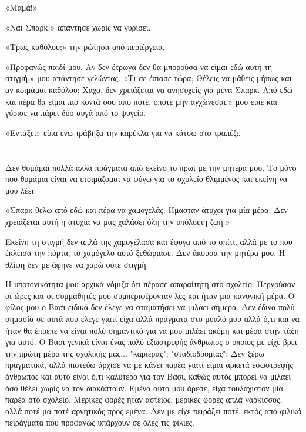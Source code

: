 \documentclass[12pt,twoside, openany]{book}
\begin{document}
«Μαμά!»

«Ναι Σπαρκ;» απάντησε χωρίς να γυρίσει.

«Τρως καθόλου;» την ρώτησα από περιέργεια.

«Προφανώς παιδί μου. Αν δεν έτρωγα δεν θα μπορούσα να είμαι εδώ αυτή τη στιγμή.» μου απάντησε γελώντας. «Τι σε έπιασε τώρα; Θέλεις να μάθεις μήπως και αν κοιμάμαι καθόλου; Χαχα, δεν χρειάζεται να ανησυχείς για μένα Σπαρκ. Από εδώ και πέρα θα είμαι πιο κοντά σου από ποτέ, οπότε μην αγχώνεσαι.» μου είπε και γύρισε να πάρει δύο αυγά από το ψυγείο.

«Εντάξει» είπα ενω τράβηξα την καρέκλα για να κάτσω στο τραπέζι.

\chapter{}

Δεν θυμάμαι πολλά άλλα πράγματα από εκείνο το πρωί με την μητέρα μου. Το μόνο που θυμάμαι είναι να ετοιμάζομαι να φύγω για το σχολείο θλιμμένος και εκείνη να μου λέει.

«Σπαρκ θελω από εδώ και πέρα να χαμογελάς. Ήμασταν άτυχοι για μία μέρα. Δεν χρειάζεται αυτή η ατυχία να μας χαλάσει όλη την υπόλοιπη ζωή.» 

Εκείνη τη στιγμή δεν απλά της χαμογέλασα και έφυγα από το σπίτι, αλλά με το που έκλεισα την πόρτα, το χαμόγελο αυτό ξεθώριασε. Δεν άκουσα την μητέρα μου. Η θλίψη δεν με άφηνε να χαρώ ούτε στιγμή.

Η υποτονικότητα μου αρχικά νόμιζα ότι πέρασε απαραίτητη στο σχολείο. Περνούσαν οι ώρες και οι συμμαθητές μου συμπεριφέρονταν λες και ήταν μια κανονική μέρα. Ο φίλος μου ο Βασι ειδικά δεν έλεγε να σταματήσει να μιλάει σήμερα. Δεν έδινα πολύ σημασία σε αυτά που έλεγε γιατί είχα αλλά πράγματα στο μυαλό μου αλλά ό,τι και να ήταν θα έπρεπε να είναι πολύ σημαντικό για να μου μιλάει ακόμη και μέσα στην τάξη για αυτό. Ο Βασι γενικά είναι ένας πολύ εξωστρεφής άνθρωπος ο οποίος με είχε βρει την πρώτη μέρα της σχολικής μας... "καριέρας"; "σταδιοδρομίας"; Δεν ξέρω πραγματικά, αλλά πιστεύω άρχισε να με κάνει παρέα γιατί είμαι αρκετά εσωστρεφής άνθρωπος και αυτό είναι ό,τι καλύτερο για τον Βασι, καθώς αυτός μπορεί να μιλάει όσο θέλει χωρίς να τον διακόπτουν. Εμένα αυτό μου άρεσε, είχα τουλάχιστον μία παρέα στο σχολείο. Μερικές φορές ήταν αστείος, μερικές φορές απλά νάρκισσος, αλλά ποτέ μα ποτέ αρνητικός προς εμένα. Δεν με είχε πειράξει ποτέ, εκτός από φιλικά πειράγματα που προφανώς υπάρχουν σε όλες τις φιλίες. 
\end{document}

